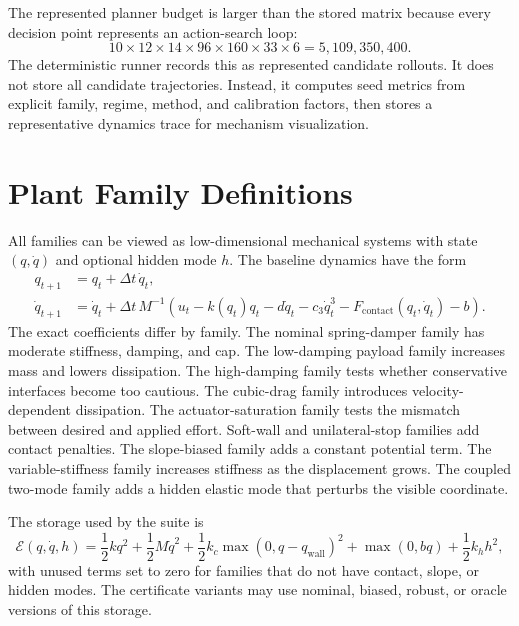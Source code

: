 \documentclass{article}
\newcommand{\storage}{\mathcal{E}}
\newcommand{\fullscale}{5,109,350,400}
\begin{document}
The represented planner budget is larger than the stored matrix because every decision point represents an action-search loop:
\begin{equation}
    10 \times 12 \times 14 \times 96 \times 160 \times 33 \times 6
    =
    \fullscale{}.
\end{equation}
The deterministic runner records this as represented candidate rollouts. It does not store all candidate trajectories. Instead, it computes seed metrics from explicit family, regime, method, and calibration factors, then stores a representative dynamics trace for mechanism visualization.

\section{Plant Family Definitions}

All families can be viewed as low-dimensional mechanical systems with state $(q,\dot q)$ and optional hidden mode $h$. The baseline dynamics have the form
\begin{align}
    q_{t+1} &= q_t+\Delta t\,\dot q_t,\\
    \dot q_{t+1} &= \dot q_t+\Delta t\,M^{-1}
    \left(u_t-k(q_t)q_t-d\dot q_t-c_3\dot q_t^3
    -F_{\mathrm{contact}}(q_t,\dot q_t)-b\right).
\end{align}
The exact coefficients differ by family. The nominal spring-damper family has moderate stiffness, damping, and cap. The low-damping payload family increases mass and lowers dissipation. The high-damping family tests whether conservative interfaces become too cautious. The cubic-drag family introduces velocity-dependent dissipation. The actuator-saturation family tests the mismatch between desired and applied effort. Soft-wall and unilateral-stop families add contact penalties. The slope-biased family adds a constant potential term. The variable-stiffness family increases stiffness as the displacement grows. The coupled two-mode family adds a hidden elastic mode that perturbs the visible coordinate.

The storage used by the suite is
\begin{equation}
    \storage(q,\dot q,h)
    =
    \frac{1}{2}kq^2+\frac{1}{2}M\dot q^2
    +\frac{1}{2}k_c\max(0,q-q_{\mathrm{wall}})^2
    +\max(0,bq)
    +\frac{1}{2}k_hh^2,
\end{equation}
with unused terms set to zero for families that do not have contact, slope, or hidden modes. The certificate variants may use nominal, biased, robust, or oracle versions of this storage.
\end{document}
